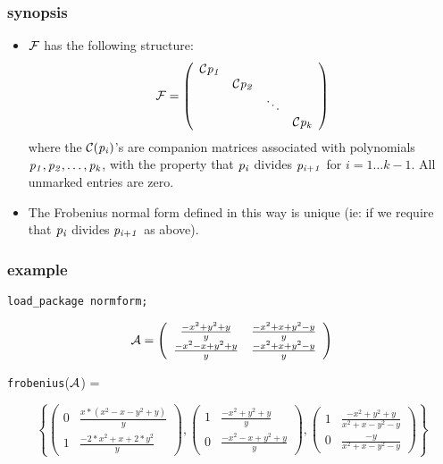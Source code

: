 \subsubsection{synopsis}

\begin{itemize}
\item ${\cal F}$ has the following structure:
      \begin{displaymath}
      {\cal F} = \left( \begin{array}{cccc} {\cal C}{\it p_{1}} &  &  & 
      \\  & {\cal C}{\it p_{2}} &  &  \\  &  & \ddots &  \\  &  &  & 
      {\cal C}{\it p_{k}} \end{array} \right) 
      \end{displaymath}
      where the ${\cal C}({\it p_{i}})$'s are companion matrices 
      associated with polynomials ${\it p_{1}, p_{2}},\ldots, 
      {\it p_{k}}$, with the property that ${\it p_{i}}$ divides 
      ${\it p_{i+1}}$ for $i =1\ldots k-1$. All unmarked entries are 
      zero.

\item The Frobenius normal form defined in this way is unique (ie: if 
      we require that ${\it p_{i}}$ divides ${\it p_{i+1}}$ as above).
\end{itemize}
 
\subsubsection{example}

{\tt load\_package normform;}

\begin{displaymath}
{\cal A} = \left( \begin{array}{cc} \frac{-x^2+y^2+y}{y} & 
\frac{-x^2+x+y^2-y}{y} \\ \frac{-x^2-x+y^2+y}{y} & \frac{-x^2+x+y^2-y}
{y} \end{array} \right)
\end{displaymath}

{\tt frobenius}(${\cal A}$) = 
\begin{center}
\begin{displaymath}
\left\{ \left( \begin{array}{cc} 0 & \frac{x*(x^2-x-y^2+y)}{y} \\ 1 & 
\frac{-2*x^2+x+2*y^2}{y} \end{array} \right), \left( \begin{array}{cc}
1 & \frac{-x^2+y^2+y}{y} \\ 0 & \frac{-x^2-x+y^2+y}{y} \end{array} 
\right), \left( \begin{array}{cc} 1 & \frac{-x^2+y^2+y}{x^2+x-y^2-y} \\
0 & \frac{-y}{x^2+x-y^2-y} \end{array} \right) \right\}
\end{displaymath}
\end{center}


